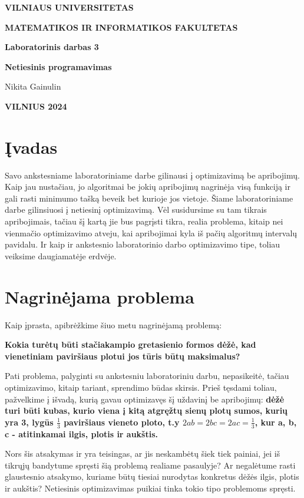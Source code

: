 \documentclass{article}
\begin{document}
\newlength{\mywidth}
\settowidth{\mywidth}{Darbo vadovas:}
\begin{titlepage}
    \vskip 20pt
    \centerline{\bf \large VILNIAUS UNIVERSITETAS}
    \bigskip
    \centerline{\large \textbf{MATEMATIKOS IR INFORMATIKOS FAKULTETAS}}
    \vskip 120pt
    \centerline{\bf \Large \textbf{Laboratorinis darbas 3}}
    \vskip 50pt
    \begin{center}
        {\bf \LARGE Netiesinis programavimas}
    \end{center}
    \bigskip
    \bigskip
    \centerline{\Large Nikita Gainulin}
    \vskip 90pt
    \vskip 200pt
    \centerline{\large \textbf{VILNIUS 2024}}
\end{titlepage}

\tableofcontents
\clearpage

\section{Įvadas}
Savo ankstesniame laboratoriniame darbe gilinausi į optimizavimą be apribojimų. Kaip jau nustačiau, jo algoritmai be jokių apribojimų nagrinėja visą funkciją ir gali rasti minimumo tašką beveik bet kurioje jos vietoje. Šiame laboratoriniame darbe gilinsiuosi į netiesinį optimizavimą. Vėl susidursime su tam tikrais apribojimais, tačiau šį kartą jie bus pagrįsti tikra, realia problema, kitaip nei vienmačio optimizavimo atveju, kai apribojimai kyla iš pačių algoritmų intervalų pavidalu. Ir kaip ir ankstesnio laboratorinio darbo optimizavimo tipe, toliau veiksime daugiamatėje erdvėje.
\section{Nagrinėjama problema}
Kaip įprasta, apibrėžkime šiuo metu nagrinėjamą problemą:

\textbf{Kokia turėtų būti stačiakampio gretasienio formos dėžė, kad vienetiniam paviršiaus plotui jos tūris būtų maksimalus?}

Pati problema, palyginti su ankstesniu laboratoriniu darbu, nepasikeitė, tačiau optimizavimo, kitaip tariant, sprendimo būdas skirsis. Prieš tęsdami toliau, pažvelkime į išvadą, kurią gavau optimizavęs šį uždavinį be apribojimų: \textbf{dėžė turi būti kubas, kurio viena į kitą atgręžtų sienų plotų sumos, kurių yra 3, lygūs $\frac{1}{3}$ paviršiaus vieneto ploto, t.y $2ab = 2bc = 2ac = \frac{1}{3}$, kur a, b, c - atitinkamai ilgis, plotis ir aukštis.}

Nors šis atsakymas ir yra teisingas, ar jis neskambėtų šiek tiek painiai, jei iš tikrųjų bandytume spręsti šią problemą realiame pasaulyje? Ar negalėtume rasti glaustesnio atsakymo, kuriame būtų tiesiai nurodytas konkretus dėžės ilgis, plotis ir aukštis? Netiesinis optimizavimas puikiai tinka tokio tipo problemoms spręsti. 
\end{document}
